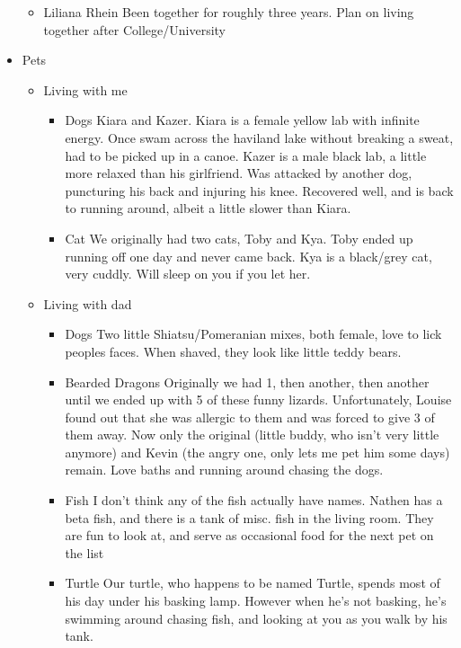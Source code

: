 \documentclass[11pt]{article}
\begin{document}
\begin{itemize}
\begin{itemize}
\item Liliana Rhein
\label{sec:orgd132777}
Been together for roughly three years. Plan on living together after College/University
\end{itemize}
\item Pets
\label{sec:orgeb91d73}
\begin{itemize}
\item Living with me
\label{sec:org2a6c2e0}
\begin{itemize}
\item Dogs
\label{sec:org5255e01}
Kiara and Kazer. Kiara is a female yellow lab with infinite energy. Once swam across the haviland lake without breaking a sweat, had to be picked up in a canoe. Kazer is a male black lab, a little more relaxed than his girlfriend. Was attacked by another dog, puncturing his back and injuring his knee. Recovered well, and is back to running around, albeit a little slower than Kiara.
\item Cat
\label{sec:orgd83410a}
We originally had two cats, Toby and Kya. Toby ended up running off one day and never came back. Kya is a black/grey cat, very cuddly. Will sleep on you if you let her.
\end{itemize}
\item Living with dad
\label{sec:orgea62e4e}
\begin{itemize}
\item Dogs
\label{sec:orgc398732}
Two little Shiatsu/Pomeranian mixes, both female, love to lick peoples faces. When shaved, they look like little teddy bears.
\item Bearded Dragons
\label{sec:org49b5db3}
Originally we had 1, then another, then another until we ended up with 5 of these funny lizards. Unfortunately, Louise found out that she was allergic to them and was forced to give 3 of them away. Now only the original (little buddy, who isn't very little anymore) and Kevin (the angry one, only lets me pet him some days) remain. Love baths and running around chasing the dogs.
\item Fish
\label{sec:orgfb43599}
I don't think any of the fish actually have names. Nathen has a beta fish, and there is a tank of misc. fish in the living room. They are fun to look at, and serve as occasional food for the next pet on the list
\item Turtle
\label{sec:orgd44987d}
Our turtle, who happens to be named Turtle, spends most of his day under his basking lamp. However when he's not basking, he's swimming around chasing fish, and looking at you as you walk by his tank.

\end{itemize}
\end{itemize}
\end{itemize}
\end{document}
